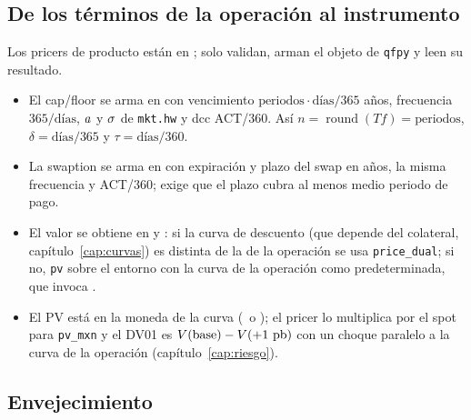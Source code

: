 \subsection{De los términos de la operación al instrumento}\label{sec:cap05-pricers}

Los pricers de producto están en ; solo validan, arman el objeto
de \texttt{qfpy} y leen su resultado.
\begin{itemize}
  \item El cap/floor se arma en  con vencimiento
        $\text{periodos}\cdot\text{días}/365$ años, frecuencia $365/\text{días}$, $a$ y $\sigma$ de
        \texttt{mkt.hw} y dcc ACT/360. Así $n=\operatorname{round}(Tf)=\text{periodos}$, $\delta=\text{días}/365$
        y $\tau=\text{días}/360$.
  \item La swaption se arma en  con expiración y plazo
        del swap en años, la misma frecuencia y ACT/360; 
        exige que el plazo cubra al menos medio periodo de pago.
  \item El valor se obtiene en  y
        : si la curva de descuento (que depende del colateral,
        capítulo~\ref{cap:curvas}) es distinta de la de la operación se usa \texttt{price\_dual}; si no,
        \texttt{pv} sobre el entorno con la curva de la operación como predeterminada, que invoca
        .
  \item El PV está en la moneda de la curva (\MXN\ o \USD); el pricer lo multiplica por el spot para
        \texttt{pv\_mxn} y el DV01 es $V(\text{base})-V(+1~\textup{pb})$ con un choque paralelo a la curva de la
        operación (capítulo~\ref{cap:riesgo}).
\end{itemize}

\subsection{Envejecimiento}\label{sec:cap05-envejecimiento}

